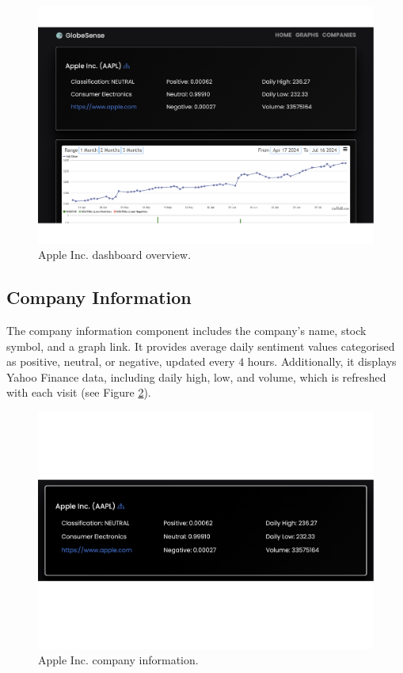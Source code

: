 \begin{figure}[htbp]
    \centering
    \includegraphics[width=\textwidth]{img/user/company-apple-a.pdf}
    \caption{Apple Inc. dashboard overview.}
    \label{fig:comapny-apple}
\end{figure}

\subsection{Company Information}
\label{subsec:company-information}
The company information component includes the company's name, stock symbol, and a graph link. It provides average daily sentiment values categorised as positive, neutral, or negative, updated every $4$ hours. Additionally, it displays Yahoo Finance data, including daily high, low, and volume, which is refreshed with each visit (see Figure \ref{fig:apple-info}).

\begin{figure}[htbp]
    \centering
    \includegraphics[width=\textwidth]{img/user/apple-info-a.pdf}
    \caption{Apple Inc. company information.}
    \label{fig:apple-info}
\end{figure}

